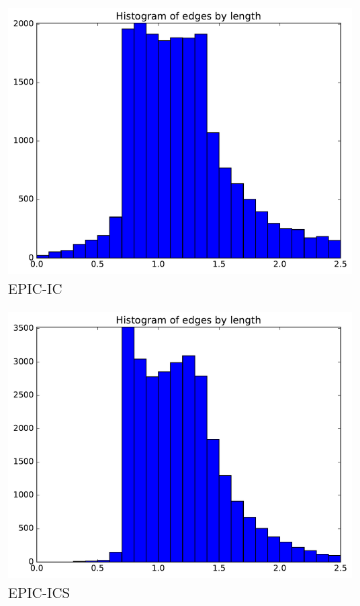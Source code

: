 \documentclass[3p,times,procedia,number]{elsarticle}
\begin{document}
\begin{figure}
\begin{subfigure}{.24\textwidth}
\centering
\includegraphics[width=\textwidth]{epic-ic-cube-cylinder-polar-1-length.pdf}
\caption{EPIC-IC}
\end{subfigure}
\begin{subfigure}{.24\textwidth}
\centering
\includegraphics[width=\textwidth]{epic-ics-cube-cylinder-polar-1-length.pdf}
\caption{EPIC-ICS}
\end{subfigure}
\begin{subfigure}{.24\textwidth}
\centering

\end{subfigure}
\end{figure}
\end{document}
